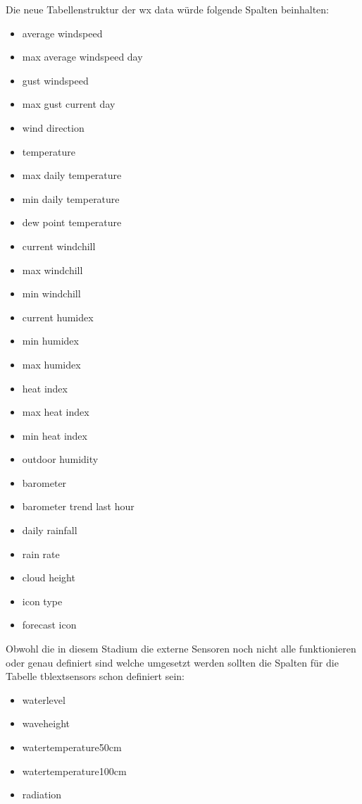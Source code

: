 Die neue Tabellenstruktur der wx data würde folgende Spalten beinhalten: 
 \begin{itemize}
\item average windspeed
\item max average windspeed day 
\item gust windspeed
\item max gust current day 
\item wind direction 
\item temperature  
\item max daily temperature 
\item min daily temperature  
\item dew point temperature 
\item current windchill  
\item max windchill 
\item min windchill
\item current humidex  
\item min humidex  
\item max humidex  
\item heat index 
\item max heat index 
\item min heat index 
\item outdoor humidity 
\item barometer 
\item barometer trend last hour 
\item daily rainfall  
\item rain rate  
\item cloud height  
\item icon type  
\item forecast icon
\end{itemize}

Obwohl die in diesem Stadium die externe Sensoren noch nicht alle funktionieren oder genau definiert sind welche umgesetzt werden sollten die  Spalten für die Tabelle tblextsensors schon definiert sein: 
\begin{itemize}
\item waterlevel
\item waveheight
\item watertemperature50cm 
\item watertemperature100cm 
\item radiation
\end{itemize}

